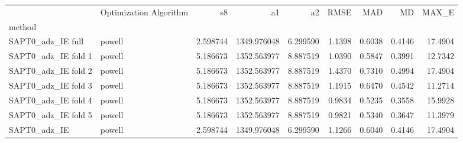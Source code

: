 \begin{tabular}{llrrrrrrr}
 & Optimization Algorithm & s8 & a1 & a2 & RMSE & MAD & MD & MAX_E \\
method &  &  &  &  &  &  &  &  \\
SAPT0_adz_IE full & powell & 2.598744 & 1349.976048 & 6.299590 & 1.1398 & 0.6038 & 0.4146 & 17.4904 \\
SAPT0_adz_IE fold 1 & powell & 5.186673 & 1352.563977 & 8.887519 & 1.0390 & 0.5847 & 0.3991 & 12.7342 \\
SAPT0_adz_IE fold 2 & powell & 5.186673 & 1352.563977 & 8.887519 & 1.4370 & 0.7310 & 0.4994 & 17.4904 \\
SAPT0_adz_IE fold 3 & powell & 5.186673 & 1352.563977 & 8.887519 & 1.1915 & 0.6470 & 0.4542 & 11.2714 \\
SAPT0_adz_IE fold 4 & powell & 5.186673 & 1352.563977 & 8.887519 & 0.9834 & 0.5235 & 0.3558 & 15.9928 \\
SAPT0_adz_IE fold 5 & powell & 5.186673 & 1352.563977 & 8.887519 & 0.9821 & 0.5340 & 0.3647 & 11.3979 \\
SAPT0_adz_IE & powell & 2.598744 & 1349.976048 & 6.299590 & 1.1266 & 0.6040 & 0.4146 & 17.4904 \\
\end{tabular}
